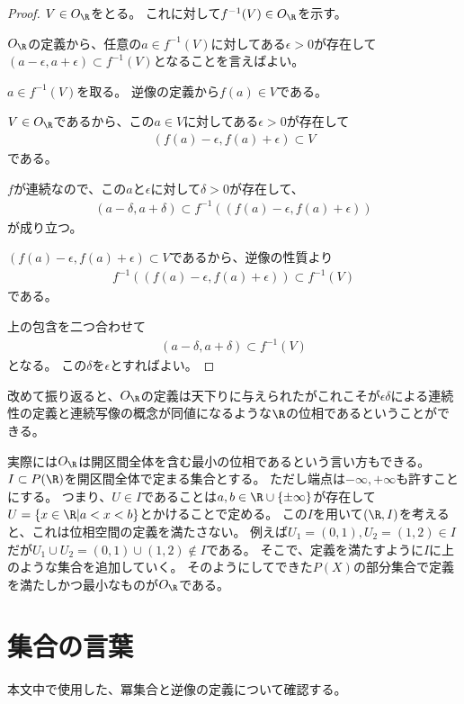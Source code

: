 \documentclass[uplatex]{jsarticle}
\begin{document}
\begin{proof}
  $V\in O_\R$をとる。
  これに対して$f^{-1}(V)\in O_\R$を示す。
  
  $O_\R$の定義から、任意の$a\in f^{-1}(V)$に対してある$\epsilon>0$が存在して$(a-\epsilon,a+\epsilon)\subset f^{-1}(V)$となることを言えばよい。
  
  $a\in f^{-1}(V)$を取る。
  逆像の定義から$f(a)\in V$である。
  
  $V\in O_\R$であるから、この$a\in V$に対してある$\epsilon>0$が存在して
  \begin{align*}
    (f(a)-\epsilon,f(a)+\epsilon)\subset V
  \end{align*}
  である。
  
  $f$が連続なので、この$a$と$\epsilon$に対して$\delta>0$が存在して、
  \begin{align*}
    (a-\delta,a+\delta)\subset f^{-1}((f(a)-\epsilon,f(a)+\epsilon))
  \end{align*}
  が成り立つ。

  $(f(a)-\epsilon,f(a)+\epsilon)\subset V$であるから、逆像の性質より
  \begin{align*}
    f^{-1}((f(a)-\epsilon,f(a)+\epsilon))\subset f^{-1}(V)
  \end{align*}
  である。
  
  上の包含を二つ合わせて
  \begin{align*}
    (a-\delta,a+\delta)\subset f^{-1}(V)
  \end{align*}
  となる。
  この$\delta$を$\epsilon$とすればよい。
\end{proof}

改めて振り返ると、$O_\R$の定義は天下りに与えられたがこれこそが$\epsilon\delta$による連続性の定義と連続写像の概念が同値になるような$\R$の位相であるということができる。

実際には$O_\R$は開区間全体を含む最小の位相であるという言い方もできる。
$I\subset P(\R)$を開区間全体で定まる集合とする。
ただし端点は$-\infty, +\infty$も許すことにする。
つまり、$U\in I$であることは$a,b\in\R\cup\{\pm\infty\}$が存在して$U=\{x\in\R\vert a<x<b\}$とかけることで定める。
この$I$を用いて$(\R,I)$を考えると、これは位相空間の定義を満たさない。
例えば$U_1=(0,1), U_2=(1,2)\in I$だが$U_1\cup U_2=(0,1)\cup(1,2)\notin I$である。
そこで、定義を満たすように$I$に上のような集合を追加していく。
そのようにしてできた$P(X)$の部分集合で定義を満たしかつ最小なものが$O_\R$である。

\section{集合の言葉}
本文中で使用した、冪集合と逆像の定義について確認する。
\end{document}
